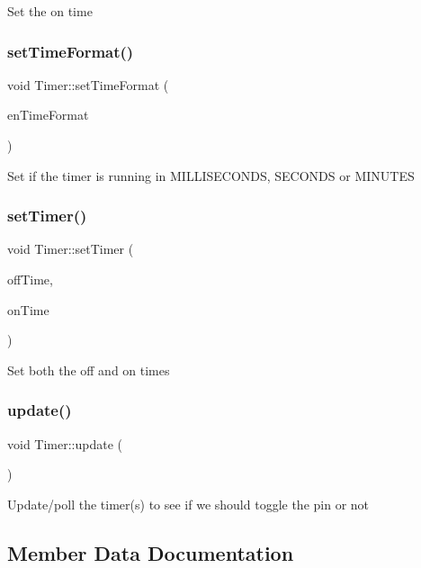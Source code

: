 Set the on time\hypertarget{class_timer_af8a1b1c47ee6812ddb29cd83deafaf36}{}\label{class_timer_af8a1b1c47ee6812ddb29cd83deafaf36} 
\subsubsection{\texorpdfstring{set\+Time\+Format()}{setTimeFormat()}}
{\footnotesize\ttfamily void Timer\+::set\+Time\+Format (\begin{DoxyParamCaption}\item[{\hyperlink{_timer_8h_add9fe45e09605eee3e4a39c8a5c4476d}{Time\+Unit}}]{en\+Time\+Format }\end{DoxyParamCaption})}

Set if the timer is running in M\+I\+L\+L\+I\+S\+E\+C\+O\+N\+DS, S\+E\+C\+O\+N\+DS or M\+I\+N\+U\+T\+ES\hypertarget{class_timer_a1a3d438cfafc29ab392e68eeea8c1952}{}\label{class_timer_a1a3d438cfafc29ab392e68eeea8c1952} 
\subsubsection{\texorpdfstring{set\+Timer()}{setTimer()}}
{\footnotesize\ttfamily void Timer\+::set\+Timer (\begin{DoxyParamCaption}\item[{unsigned long}]{off\+Time,  }\item[{unsigned long}]{on\+Time }\end{DoxyParamCaption})}

Set both the off and on times\hypertarget{class_timer_a745ad59b5a46744cd871a1129a25d74f}{}\label{class_timer_a745ad59b5a46744cd871a1129a25d74f} 
\subsubsection{\texorpdfstring{update()}{update()}}
{\footnotesize\ttfamily void Timer\+::update (\begin{DoxyParamCaption}{ }\end{DoxyParamCaption})}

Update/poll the timer(s) to see if we should toggle the pin or not

\subsection{Member Data Documentation}
\hypertarget{class_timer_a420f780693d99cab0cad9ae8202d834e}{}\label{class_timer_a420f780693d99cab0cad9ae8202d834e} 
